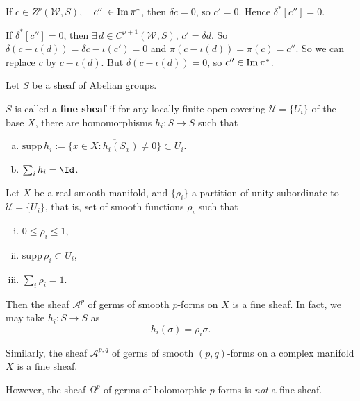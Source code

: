 \documentclass[12pt]{article}
\begin{document}
If \(c\in Z^p(\mathcal{W},S)\), \ie\ \([c'']\in \operatorname{Im}\pi^*\), then \(\delta c=0\),
so \(c'=0\). Hence \(\delta^*[c'']=0\).

If \(\delta^*[c'']=0\), then \(\exists\,d\in C^{p+1}(\mathcal{W},S)\), \(c'=\delta d\).
So \(\delta(c-\iota(d))=\delta c-\iota(c')=0\) and \(\pi(c-\iota(d))=\pi(c)=c''\).
So we can replace \(c\) by \(c-\iota(d)\). But \(\delta(c-\iota(d))=0\), so
\(c''\in \operatorname{Im}\pi^*\).



Let \(S\) be a sheaf of Abelian groups.
\begin{definition}
  \(S\) is called a \textbf{fine sheaf} if for any locally finite open covering
  \(\mathcal{U}=\{U_i\}\) of the base \(X\), there are homomorphisms
  \(h_i\colon S\to S\) such that
  \begin{enumerate}[(a)]
  \item \(\mathrm{supp}\,h_i:=\overline{\{x\in X:h_i(S_x)\neq 0\}}\subset U_i\).
  \item \(\sum_i h_i=\Id\).
  \end{enumerate}
\end{definition}
\begin{example}
  Let \(X\) be a real smooth manifold, and \(\{\rho_i\}\) a partition of unity
  subordinate to \(\mathcal{U}=\{U_i\}\), that is, set of smooth functions \(\rho_i\)
  such that
  \begin{enumerate}[(i)]
  \item \(0\le \rho_i\le 1\),
  \item \(\mathrm{supp}\,\rho_i\subset U_i\),
  \item \(\sum_i \rho_i=1\).
  \end{enumerate}
  Then the sheaf \(\mathcal{A}^p\) of germs of smooth \(p\)-forms on \(X\) is a fine
  sheaf. In fact, we may take \(h_i\colon S\to S\) as \[
    h_i(\sigma)=\rho_i \sigma
  .\] 
\end{example}
\begin{example}
  Similarly, the sheaf \(\mathcal{A}^{p,q}\) of germs of smooth \((p,q)\)-forms on
  a complex manifold \(X\) is a fine sheaf.
\end{example}
\begin{example}
  However, the sheaf \(\Omega^{p}\) of germs of holomorphic \(p\)-forms is \emph{not}
  a fine sheaf.
\end{example}
\end{document}
